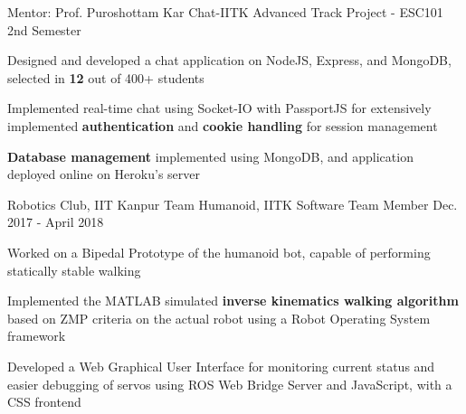 \begin{cventries}
  \cventry
    {Mentor: Prof. Puroshottam Kar}
    {Chat-IITK}
    {Advanced Track Project - ESC101}
    {2nd Semester}
    {
      \begin{cvitems}
        \item {Designed and developed a chat application on NodeJS, Express, and MongoDB, selected in \textbf{12} out of 400+ students}
        \item {Implemented real-time chat using Socket-IO with PassportJS for extensively implemented \textbf{authentication} and \textbf{cookie handling} for session management}
        \item {\textbf{Database management} implemented using MongoDB, and application deployed online on Heroku's server}
      \end{cvitems}
    }

  \cventry
    {Robotics Club, IIT Kanpur}
    {Team Humanoid, IITK}
    {Software Team Member}
    {Dec. 2017 - April 2018} 
    {
      \begin{cvitems} 
        \item {Worked on a Bipedal Prototype of the humanoid bot, capable of performing statically stable walking}
        \item {Implemented the MATLAB simulated \textbf{inverse kinematics walking algorithm} based on ZMP criteria on the actual robot using a Robot Operating System framework}
        \item {Developed a Web Graphical User Interface for monitoring current status and easier debugging of servos using ROS Web Bridge Server and JavaScript, with a CSS frontend}

      \end{cvitems}
    }



\end{cventries}
\vspace{-2mm}

